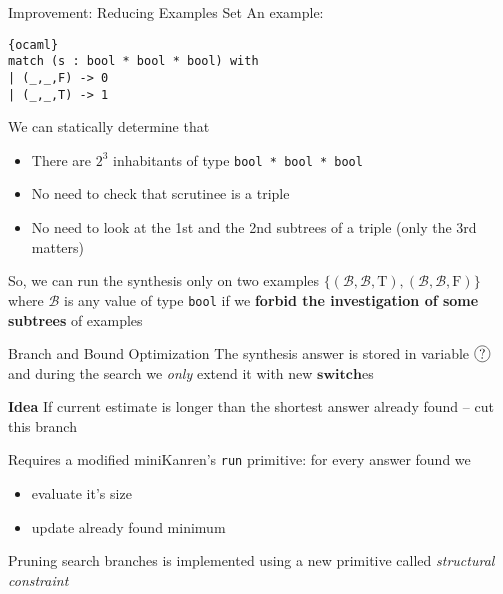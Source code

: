 \documentclass[aspectratio=169
  , xcolor={svgnames}
  , hyperref={ colorlinks,citecolor=Blue
             , linkcolor=DarkRed,urlcolor=DarkBlue}
  , russian
  ]{beamer}
\newcommand{\primi}[1]{\mathbf{#1}}
\newcommand*\circled[1]{\tikz[baseline=(char.base)]{
    \node[shape=circle,draw,inner sep=1pt] (char) {#1};}}
\begin{document}
\begin{frame}[fragile]{Improvement: Reducing Examples Set}
An example:
\begin{lstlisting}{ocaml}
match (s : bool * bool * bool) with 
| (_,_,F) -> 0
| (_,_,T) -> 1
\end{lstlisting}
\vspace{.5cm}
We can statically determine that 

\begin{itemize}
\item There are $2^3$ inhabitants of type \lstinline=bool * bool * bool=
\item No need to  check that scrutinee is a triple
\item No need to look at the 1st and  the 2nd subtrees of a triple (only the 3rd matters)
\end{itemize}
\vspace{.5cm}


So, we can run the synthesis only on two examples $\{(\mathcal{B},\mathcal{B},\text{T}),(\mathcal{B},\mathcal{B},\text{F})\}$
where $\mathcal{B}$ is any value of type \lstinline=bool=
if we \textbf{forbid the investigation of  some subtrees} of examples


\end{frame}


\begin{frame}{Branch and Bound Optimization}
The synthesis answer is stored in variable $\circled{?}$ and 
during the search we \emph{only} extend it with new $\primi{switch}$es \\

\begin{alertblock}{\textbf{Idea}}
If current estimate is longer than the shortest answer already found -- cut this branch
\end{alertblock}

Requires a modified miniKanren's \lstinline=run= primitive: for every answer found we 
\begin{itemize}
\item evaluate it's size
\item update already found minimum
\end{itemize}

Pruning search branches is implemented using a new primitive called  \emph{structural constraint}

\end{frame}
\end{document}
